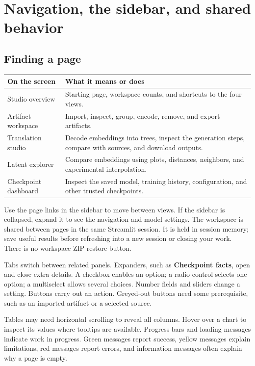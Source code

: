 \documentclass[11pt,a4paper]{article}
\makeatletter
\newcommand{\ui}[1]{\textbf{#1}}
\newenvironment{controls}{%
  \small\begin{longtable}{@{}>{\raggedright\arraybackslash}p{.34\linewidth}
    >{\raggedright\arraybackslash}p{.62\linewidth}@{}}
  \toprule\textbf{On the screen} & \textbf{What it means or does}\\\midrule\endhead
  \bottomrule\endfoot
}{\end{longtable}\normalsize}
\makeatother
\begin{document}
\section{Navigation, the sidebar, and shared behavior}
\label{sec:shared}

\subsection{Finding a page}
\begin{controls}
Studio overview & Starting page, workspace counts, and shortcuts to the four views.\\
Artifact workspace & Import, inspect, group, encode, remove, and export artifacts.\\
Translation studio & Decode embeddings into trees, inspect the generation steps,
compare with sources, and download outputs.\\
Latent explorer & Compare embeddings using plots, distances, neighbors, and
experimental interpolation.\\
Checkpoint dashboard & Inspect the saved model, training history, configuration,
and other trusted checkpoints.\\
\end{controls}

Use the page links in the sidebar to move between views. If the sidebar is
collapsed, expand it to see the navigation and model settings. The workspace is
shared between pages in the same Streamlit session. It is held in session
memory; save useful results before refreshing into a new session or closing
your work. There is no workspace-ZIP restore button.

Tabs switch between related panels. Expanders, such as \ui{Checkpoint facts},
open and close extra details. A checkbox enables an option; a radio control
selects one option; a multiselect allows several choices. Number fields and
sliders change a setting. Buttons carry out an action. Greyed-out buttons need
some prerequisite, such as an imported artifact or a selected source.

Tables may need horizontal scrolling to reveal all columns. Hover over a
chart to inspect its values where tooltips are available. Progress bars and
loading messages indicate work in progress. Green messages report success,
yellow messages explain limitations, red messages report errors, and information
messages often explain why a page is empty.
\end{document}
